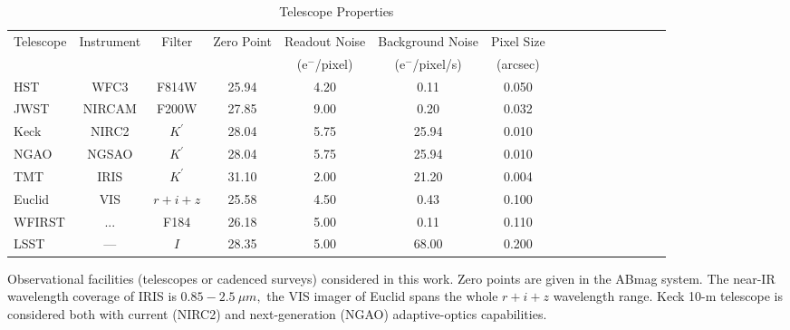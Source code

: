 \documentclass[a4paper,11pt]{article}
\begin{document}
\clearpage
\begin{table}\footnotesize
\begin{center}
\caption{Telescope Properties}
\begin{tabular}{lccccccccccccccc|}
\hline \hline
Telescope & Instrument & Filter & Zero Point & Readout Noise & Background Noise & Pixel Size \\
 & & & & (e$^-$/pixel) & (e$^-$/pixel/s) & (arcsec) \\
\hline
HST  & WFC3  &   F814W   &   25.94    &   4.20      &    0.11     &     0.050    \\
  JWST & NIRCAM  &   F200W   &    27.85   &    9.00     &     0.20    &      0.032  \\
  Keck & NIRC2  &  $K^\prime$ &   28.04    &   5.75     &  25.94      &  0.010      \\
 NGAO & NGSAO  &   $K^\prime$  &     28.04  &     5.75   &    25.94    &    0.010     \\
  TMT & IRIS  &  $K^\prime$   &  31.10   &  2.00   &     21.20    &      0.004  \\
  Euclid & VIS & $r+i+z$  &    25.58   &      4.50   &     0.43    &      0.100   \\
  WFIRST &  ... & F184    &   26.18    &     5.00    &    0.11     &     0.110   \\
  LSST   & ---  &   $I$    &     28.35  &       5.00  &      68.00   &        0.200  \\
\hline
\hline
\end{tabular}
\begin{tablenotes}
\item 
Observational facilities (telescopes or cadenced surveys) considered in this work.
 Zero points are given in the ABmag system. The near-IR wavelength coverage of IRIS is $0.85-2.5~\mu m,$ the VIS imager of Euclid spans the whole $r+i+z$ wavelength range. Keck 10-m telescope is considered both with current (NIRC2) and next-generation (NGAO) adaptive-optics capabilities.\\
\end{tablenotes}
\label{tab:telescopes parameters}
\end{center}
\end{table}
\end{document}
